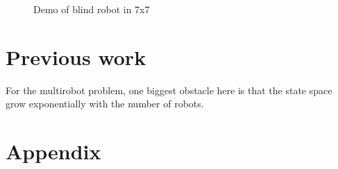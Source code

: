 \documentclass{article}
\begin{document}
\begin{figure}[!t]
\caption{Demo of blind robot in 7x7}
\label{b-2} %
\end{figure}






\section{Previous work}

For the multirobot problem, one biggest obstacle here is that the state space grow exponentially with the number of robots. 

\section{Appendix}
\end{document}
